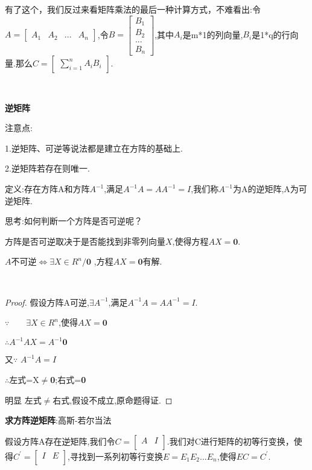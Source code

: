 \documentclass[oneside]{book}
\begin{document}
	有了这个，我们反过来看矩阵乘法的最后一种计算方式，不难看出:令$ A=\left[
	\begin{array}{cccc}
		A_{1} & A_{2} & ... & A_{n}
	\end{array}
	\right] $,令$ B=\left[
	\begin{array}{c}
		B_{1} \\
		B_{2} \\
		... \\
		B_{n} 
	\end{array}
	\right] $,其中$ A_{i} $是m*1的列向量,$ B_{i} $是1*q的行向量.那么$ C=\left[
	\begin{array}{c}
		\sum_{i=1}^{n} A_{i}B_{i}
	\end{array}
	\right] $.
	
	\hspace*{\fill}\
	
	\textbf{逆矩阵}
	
	注意点:
	
	1.逆矩阵、可逆等说法都是建立在方阵的基础上.
	
	2.逆矩阵若存在则唯一.
	
	定义:存在方阵A和方阵$ A^{-1} $,满足$ A^{-1}A=AA^{-1}=I $,我们称$ A^{-1} $为A的逆矩阵,A为可逆矩阵.
	
	思考:如何判断一个方阵是否可逆呢？
	
	方阵是否可逆取决于是否能找到非零列向量$ X $,使得方程$ AX=\textbf{0} $.
	
	$A$不可逆$\Leftrightarrow \exists X \in R^{n}/{\textbf{0}}$ ,方程$ AX=\textbf{0}$有解.
	
	\hspace*{\fill}\
	\begin{proof}
	假设方阵A可逆,$ \exists A^{-1} $,满足$ A^{-1}A=AA^{-1}=I $.
	
	$\because \qquad \exists X \in R^{n}$,使得$AX=\textbf{0}$
	
	$\therefore$\qquad $A^{-1}AX=A^{-1}\textbf{0}$
	
	又$\because$ \qquad $A^{-1}A=I$
	
	$\therefore$\qquad 左式=X$\neq$\textbf{0};右式=\textbf{0}
	
	明显 左式$\neq$右式,假设不成立,原命题得证.
    \end{proof}
	\textbf{求方阵逆矩阵}:高斯-若尔当法
	
	假设方阵A存在逆矩阵,我们令$ C=\left[ \begin{array}{cc}
		A & I \\
	\end{array} \right] $.我们对C进行矩阵的初等行变换，使得$ C^{'}=\left[ \begin{array}{cc}
	I & E \\
	\end{array} \right]  $,寻找到一系列初等行变换$ E=E_{1}E_{2}...E_{n} $,使得$ EC=C^{'}$.
\end{document}
